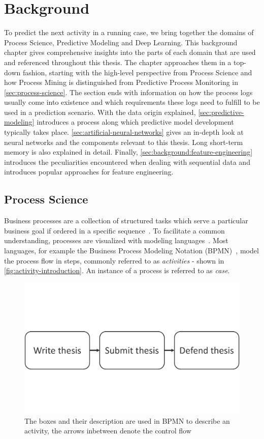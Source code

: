\chapter{Background}\label{chap:background}
To predict the next activity in a running case, we bring together the domains of Process Science, Predictive Modeling and Deep Learning. This background chapter gives comprehensive insights into the parts of each domain that are used and referenced throughout this thesis. The chapter approaches them in a top-down fashion, starting with the high-level perspective from Process Science and how Process Mining is distinguished from Predictive Process Monitoring in \autoref{sec:process-science}. The section ends with information on how the process logs usually come into existence and which requirements these logs need to fulfill to be used in a prediction scenario.
With the data origin explained, \autoref{sec:predictive-modeling} introduces a process along which predictive model development typically takes place.
\autoref{sec:artificial-neural-networks} gives an in-depth look at neural networks and the components relevant to this thesis.
Long short-term memory is also explained in detail.
Finally, \autoref{sec:background:feature-engineering} introduces the peculiarities encountered when dealing with sequential data and introduces popular approaches for feature engineering.

\section{Process Science}\label{sec:process-science}
Business processes are a collection of structured tasks which serve a particular business goal if ordered in a specific sequence~\cite{weske2012business}. To facilitate a common understanding, processes are visualized with modeling languages~\cite{panagacos2012ultimate}. Most languages, for example the Business Process Modeling Notation (BPMN)~\cite{bpmn2.0}, model the process flow in steps, commonly referred to as \textit{activities} - shown in \autoref{fig:activity-introduction}. An instance of a process is referred to as \textit{case}.

\begin{figure}[!htb]
    \centering
    \includegraphics[width=.75\textwidth]{gfx/activity-sequence.pdf}
    \caption[Control flow in BPMN]{The boxes and their description are used in BPMN to describe an activity, the arrows inbetween denote the control flow}
    \label{fig:activity-introduction}
\end{figure}

